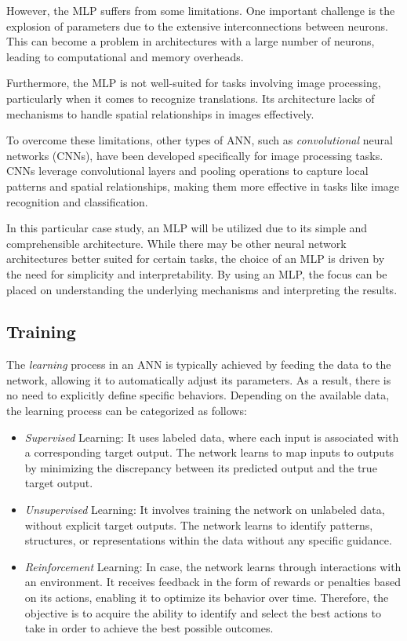 However, the MLP suffers from some limitations. One important challenge is the explosion of parameters due to the extensive interconnections between neurons. This can become a problem in architectures with a large number of neurons, leading to computational and memory overheads.

Furthermore, the MLP is not well-suited for tasks involving image processing, particularly when it comes to recognize translations. Its architecture lacks of mechanisms to handle spatial relationships in images effectively.

To overcome these limitations, other types of ANN, such as \textit{convolutional} neural networks (CNNs), have been developed specifically for image processing tasks. CNNs leverage convolutional layers and pooling operations to capture local patterns and spatial relationships, making them more effective in tasks like image recognition and classification.

In this particular case study, an MLP will be utilized due to its simple and comprehensible architecture. While there may be other neural network architectures better suited for certain tasks, the choice of an MLP is driven by the need for simplicity and interpretability. By using an MLP, the focus can be placed on understanding the underlying mechanisms and interpreting the results.

\subsection{Training}

The \textit{learning} process in an ANN is typically achieved by feeding the data to the network, allowing it to automatically adjust its parameters. As a result, there is no need to explicitly define specific behaviors. Depending on the available data, the learning process can be categorized as follows:


\begin{itemize}
	\item \textit{Supervised} Learning: It uses labeled data, where each input is associated with a corresponding target output. The network learns to map inputs to outputs by minimizing the discrepancy between its predicted output and the true target output.
	\item \textit{Unsupervised} Learning: It involves training the network on unlabeled data, without explicit target outputs. The network learns to identify patterns, structures, or representations within the data without any specific guidance.
	\item \textit{Reinforcement} Learning: In case, the network learns through interactions with an environment. It receives feedback in the form of rewards or penalties based on its actions, enabling it to optimize its behavior over time. Therefore, the objective is to acquire the ability to identify and select the best actions to take in order to achieve the best possible outcomes.
\end{itemize}

